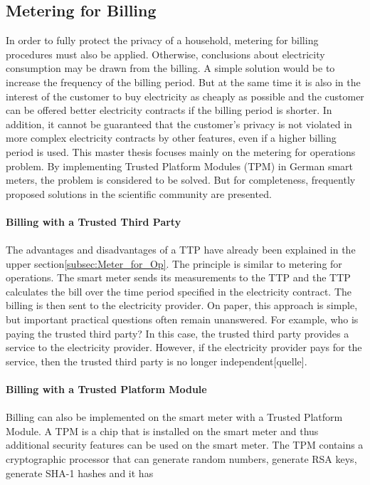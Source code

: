 \subsection{Metering for Billing}
In order to fully protect the privacy of a household, metering for billing procedures must also be applied. Otherwise, conclusions about electricity consumption may be drawn from the billing. A simple solution would be to increase the frequency of the billing period. But at the same time it is also in the interest of the customer to buy electricity as cheaply as possible and the customer can be offered better electricity contracts if the billing period is shorter. In addition, it cannot be guaranteed that the customer's privacy is not violated in more complex electricity contracts by other features, even if a higher billing period is used. %
This master thesis focuses mainly on the metering for operations problem. 
By implementing Trusted Platform Modules (TPM) in German smart meters, the problem is considered to be solved. But for completeness, frequently proposed solutions in the scientific community are presented.\\
\\
\textbf{Billing with a Trusted Third Party}
\\
\\
The advantages and disadvantages of a TTP have already been explained in the upper section\ref{subsec:Meter_for_Op}. The principle is similar to metering for operations. The smart meter sends its measurements to the TTP and the TTP calculates the bill over the time period specified in the electricity contract. The billing is then sent to the electricity provider. On paper, this approach is simple, but important practical questions often remain unanswered. For example, who is paying the trusted third party? In this case, the trusted third party provides a service to the electricity provider. However, if the electricity provider pays for the service, then the trusted third party is no longer independent[quelle].\\
\\
\textbf{Billing with a Trusted Platform Module}
\\
\\
Billing can also be implemented on the smart meter with a Trusted Platform Module. A TPM is a chip that is installed on the smart meter and thus additional security features can be used on the smart meter. The TPM contains a cryptographic processor that can generate random numbers, generate RSA keys, generate SHA-1 hashes and it has
